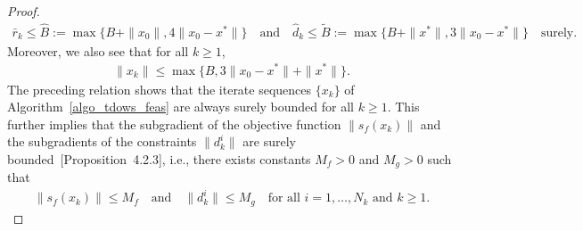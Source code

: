 \documentclass{article}
\theoremstyle{plain}
\theoremstyle{definition}
\theoremstyle{remark}
\begin{document}
\begin{proof}
\begin{align}
        \bar r_k \leq \widehat B := \max\{B + \|x_0\|, 4 \|x_0 - x^*\|\} \quad \text{and} \quad \hat d_k \leq \widetilde B := \max\{B + \|x^*\|, 3 \|x_0 - x^*\|\} \quad \text{surely}. \label{d_and_r_bd}
    \end{align}
    Moreover, we also see that for all $k \geq 1$,
    \begin{align*}
        \|x_k\| \leq \max\{B, 3\|x_0 - x^*\| + \|x^*\| \} .
    \end{align*}
    The preceding relation shows that the iterate sequences $\{x_k\}$ of Algorithm~\ref{algo_tdows_feas} are always surely bounded for all $k \geq 1$. This further implies that the subgradient of the objective function $\|s_f(x_k)\|$ and the subgradients of the constraints $\|d_k^i\|$ are surely bounded~\cite{bertsekas2003convex}[Proposition~4.2.3], i.e., there exists constants $M_f > 0$ and $M_g > 0$ such that
    \begin{align}
        \|s_f(x_k)\| \leq M_f \quad \text{and} \quad  \|d_k^i\| \leq M_g \quad \text{for all $i = 1, \ldots, N_k$ and $k \geq 1$.} \label{grad_subgrad_bd}
    \end{align}


\end{proof}
\end{document}
